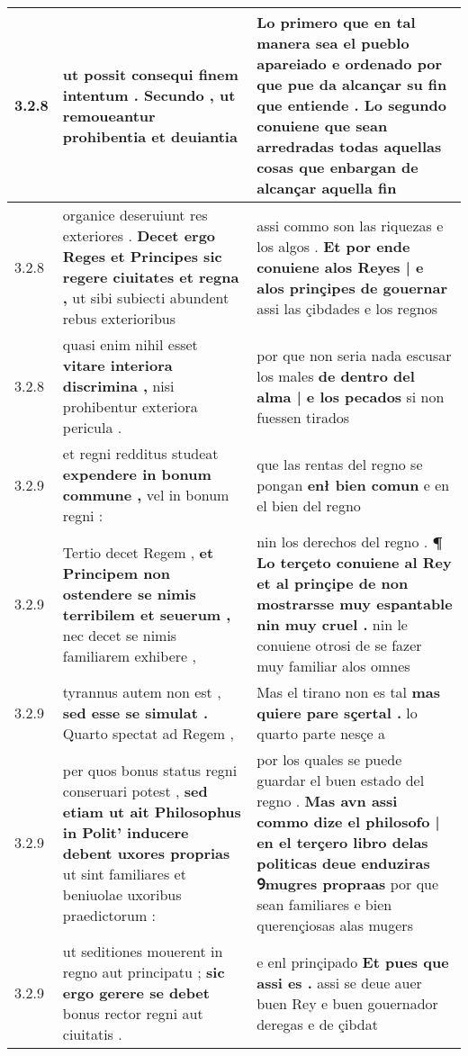 \begin{tabular}{|p{1cm}|p{6.5cm}|p{6.5cm}|}
3.2.8 & ut possit \textbf{ consequi finem intentum . } Secundo , ut remoueantur prohibentia et deuiantia & Lo primero que en tal manera sea el pueblo apareiado e ordenado por que pue da alcançar su fin que entiende . \textbf{ Lo segundo conuiene que sean arredradas todas aquellas cosas } que enbargan de alcançar aquella fin \\\hline
3.2.8 & organice deseruiunt res exteriores . \textbf{ Decet ergo Reges et Principes sic regere ciuitates et regna , } ut sibi subiecti abundent rebus exterioribus & assi commo son las riquezas e los algos . \textbf{ Et por ende conuiene alos Reyes | e alos prinçipes de gouernar } assi las çibdades e los regnos \\\hline
3.2.8 & quasi enim nihil esset \textbf{ vitare interiora discrimina , } nisi prohibentur exteriora pericula . & por que non seria nada escusar los males \textbf{ de dentro del alma | e los pecados } si non fuessen tirados \\\hline
3.2.9 & et regni redditus studeat \textbf{ expendere in bonum commune , } vel in bonum regni : & que las rentas del regno se pongan \textbf{ enł bien comun } e en el bien del regno \\\hline
3.2.9 & Tertio decet Regem , \textbf{ et Principem non ostendere se nimis terribilem et seuerum , } nec decet se nimis familiarem exhibere , & nin los derechos del regno . \textbf{ ¶ Lo terçeto conuiene al Rey et al prinçipe de non mostrarsse muy espantable nin muy cruel . } nin le conuiene otrosi de se fazer muy familiar alos omnes \\\hline
3.2.9 & tyrannus autem non est , \textbf{ sed esse se simulat . } Quarto spectat ad Regem , & Mas el tirano non es tal \textbf{ mas quiere pare sçertal . } lo quarto parte nesçe a \\\hline
3.2.9 & per quos bonus status regni conseruari potest , \textbf{ sed etiam ut ait Philosophus in Polit’ inducere debent uxores proprias } ut sint familiares et beniuolae uxoribus praedictorum : & por los quales se puede guardar el buen estado del regno . \textbf{ Mas avn assi commo dize el philosofo | en el terçero libro delas politicas deue enduziras Ꝯmugres propraas } por que sean familiares e bien querençiosas alas mugers \\\hline
3.2.9 & ut seditiones mouerent in regno aut principatu ; \textbf{ sic ergo gerere se debet } bonus rector regni aut ciuitatis . & e enl prinçipado \textbf{ Et pues que assi es . } assi se deue auer buen Rey e buen gouernador deregas e de çibdat \\\hline

\end{tabular}
